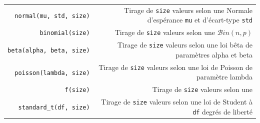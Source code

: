 \documentclass[12pt,]{book}
\numberwithin{equation}{section}
\numberwithin{countremarque}{section}
\begin{document}
\begin{longtable}[]{@{}rr@{}}
\begin{minipage}[t]{0.18\columnwidth}\raggedleft\strut
\texttt{normal(mu,\ std,\ size)}\strut
\end{minipage} & \begin{minipage}[t]{0.71\columnwidth}\raggedleft\strut
Tirage de \texttt{size} valeurs selon une Normale d'espérance
\texttt{mu} et d'écart-type \texttt{std}\strut
\end{minipage}\tabularnewline
\begin{minipage}[t]{0.18\columnwidth}\raggedleft\strut
\texttt{binomial(size)}\strut
\end{minipage} & \begin{minipage}[t]{0.71\columnwidth}\raggedleft\strut
Tirage de \texttt{size} valeurs selon une \(\mathcal{B}in(n,p)\)\strut
\end{minipage}\tabularnewline
\begin{minipage}[t]{0.18\columnwidth}\raggedleft\strut
\texttt{beta(alpha,\ beta,\ size)}\strut
\end{minipage} & \begin{minipage}[t]{0.71\columnwidth}\raggedleft\strut
Tirage de \texttt{size} valeurs selon une loi bêta de paramètres alpha
et beta\strut
\end{minipage}\tabularnewline
\begin{minipage}[t]{0.18\columnwidth}\raggedleft\strut
\texttt{poisson(lambda,\ size)}\strut
\end{minipage} & \begin{minipage}[t]{0.71\columnwidth}\raggedleft\strut
Tirage de \texttt{size} valeurs selon une loi de Poisson de paramètre
lambda\strut
\end{minipage}\tabularnewline
\begin{minipage}[t]{0.18\columnwidth}\raggedleft\strut
\texttt{f(size)}\strut
\end{minipage} & \begin{minipage}[t]{0.71\columnwidth}\raggedleft\strut
Tirage de \texttt{size} valeurs selon une\strut
\end{minipage}\tabularnewline
\begin{minipage}[t]{0.18\columnwidth}\raggedleft\strut
\texttt{standard\_t(df,\ size)}\strut
\end{minipage} & \begin{minipage}[t]{0.71\columnwidth}\raggedleft\strut
Tirage de \texttt{size} valeurs selon une loi de Student à \texttt{df}
degrés de liberté\strut
\end{minipage}\tabularnewline
\bottomrule
\end{longtable}
\end{document}
